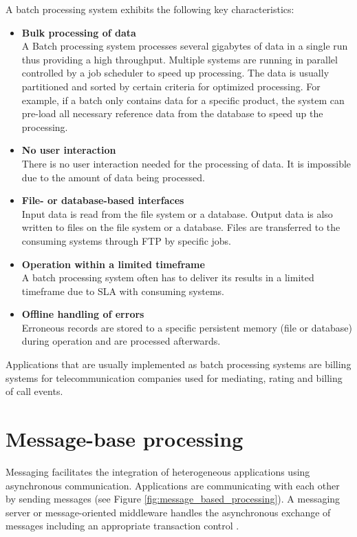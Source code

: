 A batch processing system exhibits the following key characteristics:
\begin{itemize}
	\item \textbf{Bulk processing of data}\\
	A Batch processing system processes several gigabytes of data in a single run thus providing a high throughput. Multiple systems are running in parallel controlled by a job scheduler to speed up processing. The data is usually partitioned and sorted by certain criteria for optimized processing. For example, if a batch only contains data for a specific product, the system can pre-load all necessary reference data from the database to speed up the processing.
	\item \textbf{No user interaction}\\
	There is no user interaction needed for the processing of data. It is impossible due to the amount of data being processed.
	\item \textbf{File- or database-based interfaces}\\
	Input data is read from the file system or a database. Output data is also written to files on the file system or a database. Files are transferred to the consuming systems through FTP by specific jobs.
	\item \textbf{Operation within a limited timeframe}\\
	A batch processing system often has to deliver its results in a limited timeframe due to \ac{SLA} with consuming systems.
	\item \textbf{Offline handling of errors}\\
	Erroneous records are stored to a specific persistent memory (file or database) during operation and are processed afterwards.
\end{itemize}
Applications that are usually implemented as batch processing systems are billing systems for telecommunication companies used for mediating, rating and billing of call events.

\section{Message-base processing}\label{sec:message_processing}
Messaging facilitates the integration of heterogeneous applications using asynchronous communication. Applications are communicating with each other by sending messages (see Figure \ref{fig:message_based_processing}). A messaging server or message-oriented middleware handles the asynchronous exchange of messages including an appropriate transaction control \cite{conrad2006enterprise}.

